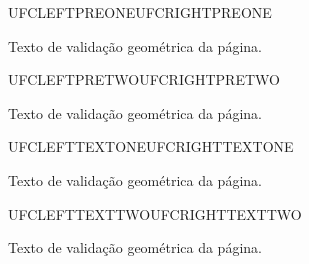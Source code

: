 \documentclass{abntexto-ufc}
\newcommand{\geometriapagina}[1]{%
  \noindent UFCLEFT#1\hfill UFCRIGHT#1\par
  \vspace{2\baselineskip}
  Texto de validação geométrica da página.
}
\begin{document}
\ufcPrintCover

\pretextual
\geometriapagina{PREONE}
\newpage
\geometriapagina{PRETWO}

\textual
\geometriapagina{TEXTONE}
\newpage
\geometriapagina{TEXTTWO}
\end{document}
